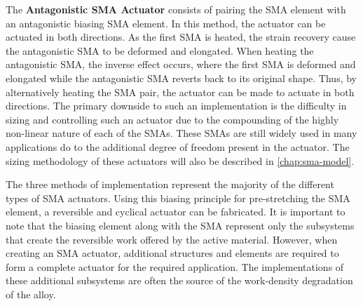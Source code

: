 The \textbf{Antagonistic SMA Actuator} consists of pairing the SMA element with an antagonistic biasing SMA element. In this method, the actuator can be actuated in both directions. As the first SMA is heated, the strain recovery cause the antagonistic SMA to be deformed and elongated. When heating the antagonistic SMA, the inverse effect occurs, where the first SMA is deformed and elongated while the antagonistic SMA reverts back to its original shape. Thus, by alternatively heating the SMA pair, the actuator can be made to actuate in both directions. The primary downside to such an implementation is the difficulty in sizing and controlling such an actuator due to the compounding of the highly non-linear nature of each of the SMAs. These SMAs are still widely used in many applications do to the additional degree of freedom present in the actuator. The sizing methodology of these actuators will also be described in \cref{chap:sma-model}.

The three methods of implementation represent the majority of the different types of SMA actuators. Using this biasing principle for pre-stretching the SMA element, a reversible and cyclical actuator can be fabricated. It is important to note that the biasing element along with the SMA represent only the subsystems that create the reversible work offered by the active material. However, when creating an SMA actuator, additional structures and elements are required to form a complete actuator for the required application. The implementations of these additional subsystems are often the source of the work-density degradation of the alloy.

